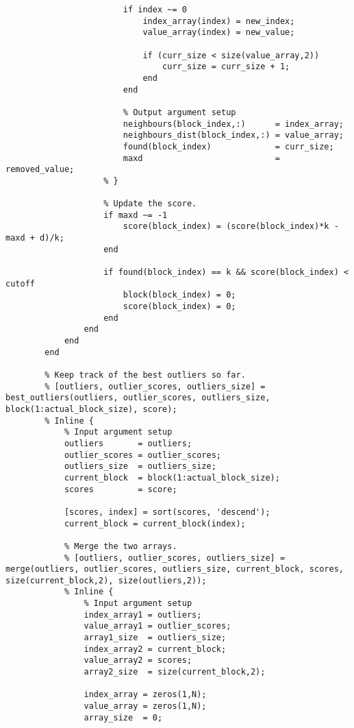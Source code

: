 \begin{lstlisting}
                        if index ~= 0
                            index_array(index) = new_index;
                            value_array(index) = new_value;

                            if (curr_size < size(value_array,2))
                                curr_size = curr_size + 1;
                            end
                        end

                        % Output argument setup
                        neighbours(block_index,:)      = index_array;
                        neighbours_dist(block_index,:) = value_array;
                        found(block_index)             = curr_size;
                        maxd                           = removed_value;
                    % }

                    % Update the score.
                    if maxd ~= -1
                        score(block_index) = (score(block_index)*k - maxd + d)/k;
                    end

                    if found(block_index) == k && score(block_index) < cutoff
                        block(block_index) = 0;
                        score(block_index) = 0;
                    end
                end
            end
        end

        % Keep track of the best outliers so far.
        % [outliers, outlier_scores, outliers_size] = best_outliers(outliers, outlier_scores, outliers_size, block(1:actual_block_size), score);
        % Inline {
            % Input argument setup
            outliers       = outliers;
            outlier_scores = outlier_scores;
            outliers_size  = outliers_size;
            current_block  = block(1:actual_block_size);
            scores         = score;

            [scores, index] = sort(scores, 'descend');
            current_block = current_block(index);

            % Merge the two arrays.
            % [outliers, outlier_scores, outliers_size] = merge(outliers, outlier_scores, outliers_size, current_block, scores, size(current_block,2), size(outliers,2));
            % Inline {
                % Input argument setup
                index_array1 = outliers;
                value_array1 = outlier_scores;
                array1_size  = outliers_size;
                index_array2 = current_block;
                value_array2 = scores;
                array2_size  = size(current_block,2);

                index_array = zeros(1,N);
                value_array = zeros(1,N);
                array_size  = 0;


\end{lstlisting}
